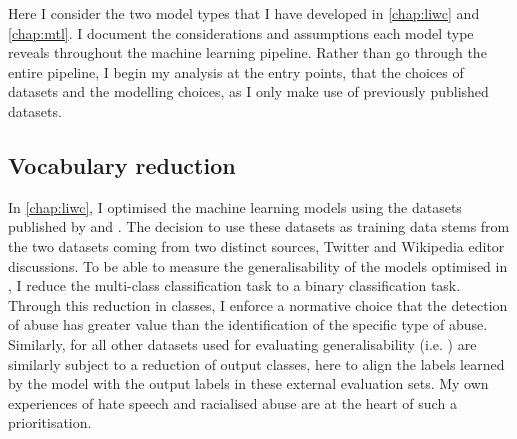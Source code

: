 Here I consider the two model types that I have developed in \autoref{chap:liwc} and \autoref{chap:mtl}. I document the considerations and assumptions each model type reveals throughout the machine learning pipeline. Rather than go through the entire pipeline, I begin my analysis at the entry points, that the choices of datasets and the modelling choices, as I only make use of previously published datasets.

\subsection{Vocabulary reduction}\label{sub:vocab_redux}

In \autoref{chap:liwc}, I optimised the machine learning models using the datasets published by \citet{Davidson:2017} and \citet{Wulczyn:2016}. The decision to use these datasets as training data stems from the two datasets coming from two distinct sources, Twitter and Wikipedia editor discussions.
To be able to measure the generalisability of the models optimised in \citet{Davidson:2017}, I reduce the multi-class classification task to a binary classification task. Through this reduction in classes, I enforce a normative choice that the detection of abuse has greater value than the identification of the specific type of abuse. Similarly, for all other datasets used for evaluating generalisability (i.e. \citet{Waseem:2016,Waseem-Hovy:2016,Gibert:2018}) are similarly subject to a reduction of output classes, here to align the labels learned by the model with the output labels in these external evaluation sets. My own experiences of hate speech and racialised abuse are at the heart of such a prioritisation.

